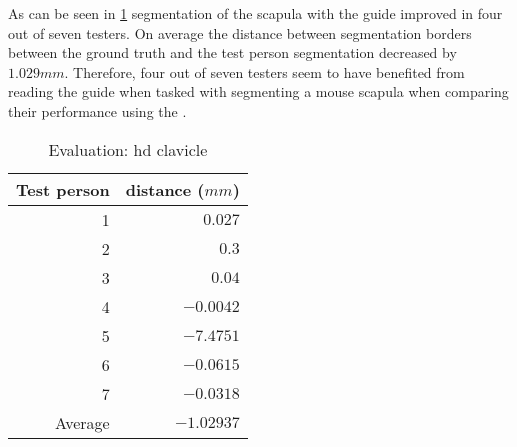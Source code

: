 \noindent
As can be seen in \cref{tab:clavicle-distance} segmentation of the scapula with the guide improved in four out of seven testers.
On average the distance between segmentation borders between the ground truth and the test person segmentation decreased by $1.029mm$.
Therefore, four out of seven testers seem to have benefited from reading the guide when tasked with segmenting a mouse scapula when comparing their performance using the .
\begin{table}[ht]
	\begin{center}
		\begin{tabular}{r r}
			\textbf{Test person} & \textbf{distance ($mm$)} \\
			\hline
			1                    & $0.027$                  \\
			2                    & $0.3$                    \\
			3                    & $0.04$                   \\
			4                    & $-0.0042$                \\
			5                    & $-7.4751$                \\
			6                    & $-0.0615$                \\
			7                    & $-0.0318$                \\
			\hline
			Average              & $-1.02937$               \\
		\end{tabular}
		\caption{Evaluation: \acrshort{hd} clavicle}\label{tab:clavicle-distance}
	\end{center}
\end{table}



